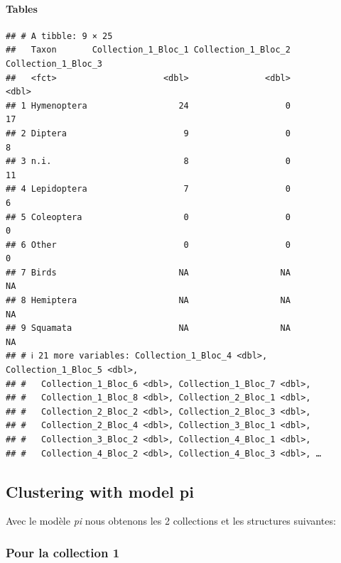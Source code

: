 \hypertarget{tables}{%
\paragraph{Tables}\label{tables}}

\begin{verbatim}
## # A tibble: 9 × 25
##   Taxon       Collection_1_Bloc_1 Collection_1_Bloc_2 Collection_1_Bloc_3
##   <fct>                     <dbl>               <dbl>               <dbl>
## 1 Hymenoptera                  24                   0                  17
## 2 Diptera                       9                   0                   8
## 3 n.i.                          8                   0                  11
## 4 Lepidoptera                   7                   0                   6
## 5 Coleoptera                    0                   0                   0
## 6 Other                         0                   0                   0
## 7 Birds                        NA                  NA                  NA
## 8 Hemiptera                    NA                  NA                  NA
## 9 Squamata                     NA                  NA                  NA
## # ℹ 21 more variables: Collection_1_Bloc_4 <dbl>, Collection_1_Bloc_5 <dbl>,
## #   Collection_1_Bloc_6 <dbl>, Collection_1_Bloc_7 <dbl>,
## #   Collection_1_Bloc_8 <dbl>, Collection_2_Bloc_1 <dbl>,
## #   Collection_2_Bloc_2 <dbl>, Collection_2_Bloc_3 <dbl>,
## #   Collection_2_Bloc_4 <dbl>, Collection_3_Bloc_1 <dbl>,
## #   Collection_3_Bloc_2 <dbl>, Collection_4_Bloc_1 <dbl>,
## #   Collection_4_Bloc_2 <dbl>, Collection_4_Bloc_3 <dbl>, …
\end{verbatim}

\hypertarget{clustering-with-model-pi}{%
\subsection{Clustering with model pi}\label{clustering-with-model-pi}}

Avec le modèle \emph{pi} nous obtenons les 2 collections et les
structures suivantes:

\subsubsection{Pour la collection 1 }

